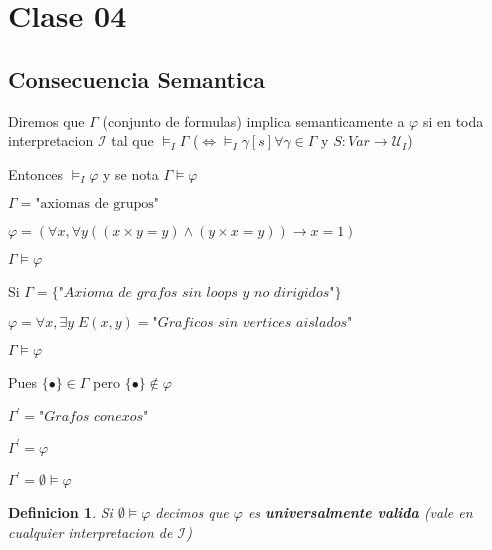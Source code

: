 \documentclass{amsart}
\newtheorem{definition}{Definicion}
\begin{document}
\section{Clase 04}

\subsection{Consecuencia Semantica}

Diremos que $\Gamma$ (conjunto de formulas) implica semanticamente a $\varphi$ si en toda interpretacion $\mathcal{I}$ tal que $\models_{I} \Gamma$ ($\iff \models_{I} \gamma[s] \forall \gamma \in \Gamma$ y $S \colon Var \rightarrow \mathcal{U}_{I}$)

Entonces $\models_{I} \varphi$ y se nota $\Gamma \models \varphi$

\begin{example}
$\Gamma = \text{"axiomas de grupos"}$ 

$\varphi = (\forall x, \forall y ((x \times y = y) \land (y \times x = y)) \rightarrow x = 1)$

$\Gamma \models \varphi$

Si $\Gamma = \{ \textit{"Axioma de grafos sin loops y no dirigidos"} \}$

$\varphi = \forall x, \exists y \; E(x, y) = \textit{"Graficos sin vertices aislados"}$

$\Gamma \models \varphi$

Pues $\{ \bullet \} \in \Gamma$ pero $\{ \bullet \} \notin \varphi$

$\Gamma^{'} = \textit{"Grafos conexos"}$

$\Gamma^{'} = \varphi$

$\Gamma^{'} = \emptyset \models \varphi$

\end{example}

\begin{definition}
Si $\emptyset \models \varphi$ decimos que $\varphi$ es \textbf{universalmente valida} (vale en cualquier interpretacion de $\mathcal{I}$)
\end{definition}
\end{document}
